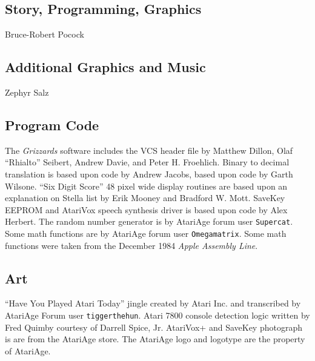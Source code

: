 \documentclass[10pt,twocolumn,openany,article]{memoir}
\begin{document}
\fi

\fi %


\vfill


\pagebreak


\subsection{Story, Programming, Graphics}

Bruce-Robert Pocock

\subsection{Additional Graphics and Music}

Zephyr Salz

\subsection{Program Code}

The \textit{Grizzards} software includes the  VCS header file by Matthew
Dillon, Olaf ``Rhialto'' Seibert, Andrew  Davie, and Peter H. Froehlich.
Binary to decimal translation is based upon code by Andrew Jacobs, based
upon code  by Garth Wilsone. ``Six  Digit Score'' 48 pixel  wide display
routines are based upon an explanation on Stella list by Erik Mooney and
Bradford W. Mott. \ifdefined\ATARIAGESAVE\else  SaveKey EEPROM and \fi{}
AtariVox speech  synthesis driver  is based upon  code by  Alex Herbert.
The random number generator is by AtariAge forum user \texttt{Supercat}.
Some math  functions are by AtariAge  forum user \texttt{Omega\-matrix}.
Some  math functions  were taken  from the  December 1984  \textit{Apple
  Assembly  Line}. 

\subsection{Art}

``Have  You Played  Atari Today''  jingle created  by
Atari    Inc.     and    transcribed    by    AtariAge     Forum    user
\texttt{tigger\-the\-hun}. Atari 7800 console detection logic written by
Fred    Quimby    courtesy    of   Darrell    Spice,    Jr.    AtariVox+
\ifdefined\ATARIAGESAVE\else          and         SaveKey          \fi{}
photograph\ifdefined\ATARIAGESAVE{}  is    are  \fi{}  from  the
AtariAge store.  \ifdefined\ATARIAGESAVE The AtariAge logo  and logotype
are the property of AtariAge. \fi
\end{document}
